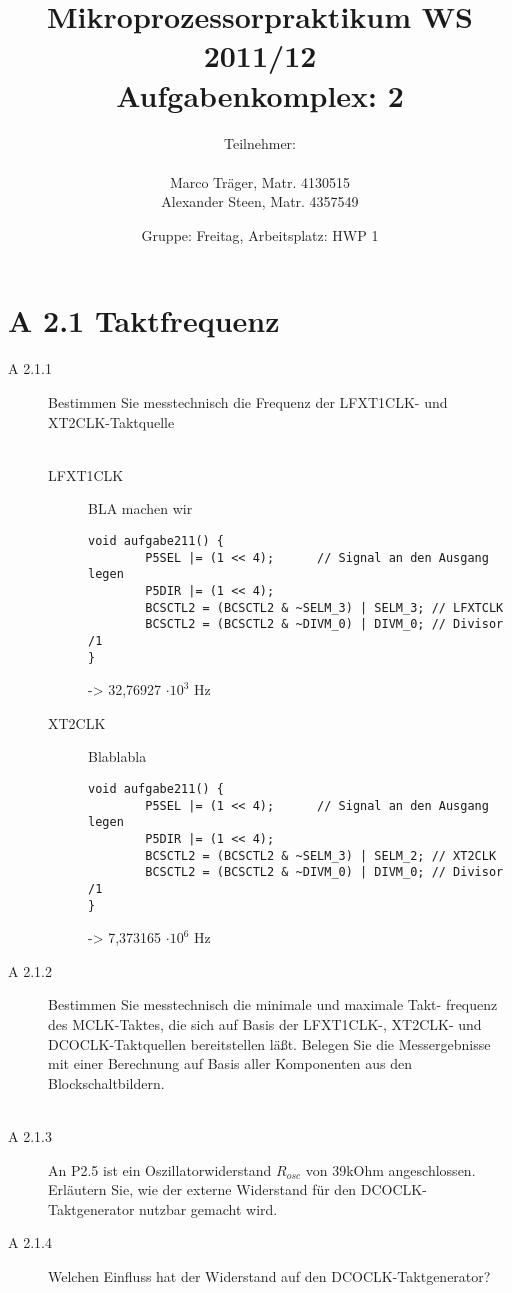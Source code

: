 \documentclass[11pt,a4paper,ngerman]{article}
\author{Teilnehmer:\\ \\Marco Träger, Matr. 4130515\\Alexander Steen, Matr. 4357549}
\date{Gruppe: Freitag, Arbeitsplatz: HWP 1}
\title{Mikroprozessorpraktikum WS 2011/12\\ Aufgabenkomplex: 2}
\begin{document}

\maketitle
\thispagestyle{fancy}
\newpage
\section*{A 2.1 Taktfrequenz}

\begin{description}
	\item[A 2.1.1] Bestimmen Sie messtechnisch die Frequenz der LFXT1CLK- und XT2CLK-Taktquelle \\ \\
		\begin{description}
			\item[LFXT1CLK] BLA machen wir
			\begin{lstlisting}
void aufgabe211() {
        P5SEL |= (1 << 4);		// Signal an den Ausgang legen
        P5DIR |= (1 << 4);
        BCSCTL2 = (BCSCTL2 & ~SELM_3) | SELM_3; // LFXTCLK
        BCSCTL2 = (BCSCTL2 & ~DIVM_0) | DIVM_0; // Divisor /1
}
			\end{lstlisting}

-> 32,76927 $\cdot 10^3 $ Hz
			\item[XT2CLK]  Blablabla
			\begin{lstlisting}
void aufgabe211() {
        P5SEL |= (1 << 4);		// Signal an den Ausgang legen
        P5DIR |= (1 << 4);
        BCSCTL2 = (BCSCTL2 & ~SELM_3) | SELM_2; // XT2CLK
        BCSCTL2 = (BCSCTL2 & ~DIVM_0) | DIVM_0; // Divisor /1
}	
			\end{lstlisting}
-> 7,373165 $\cdot 10^6  $ Hz
		\end{description}
	

	\item[A 2.1.2] Bestimmen Sie messtechnisch die minimale und maximale Takt- frequenz des MCLK-Taktes, die sich auf Basis der LFXT1CLK-, XT2CLK- und DCOCLK-Taktquellen bereitstellen läßt. Belegen Sie die Messergebnisse mit einer Berechnung auf Basis aller Komponenten aus den Blockschaltbildern. \\ \\

	
		
	\item[A 2.1.3] An P2.5 ist ein Oszillatorwiderstand $R_{osc}$ von 39kOhm angeschlossen. Erläutern Sie, wie der externe Widerstand für den DCOCLK-Taktgenerator nutzbar gemacht wird.  
		
		
	\item[A 2.1.4] Welchen Einfluss hat der Widerstand auf den DCOCLK-Taktgenerator?  \\
	

\end{description}
\end{document}
